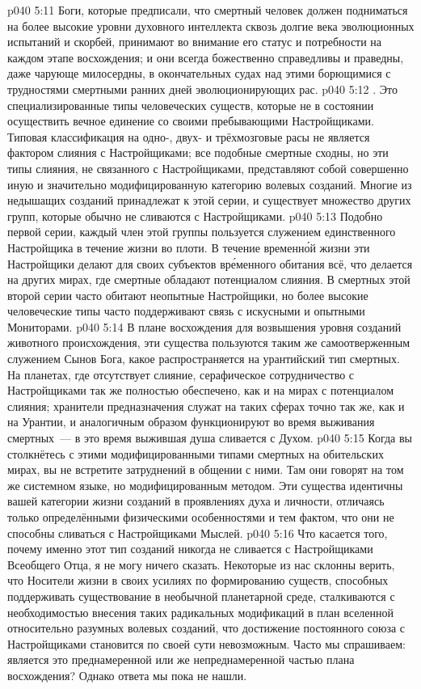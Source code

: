 \vs p040 5:11 \pc Боги, которые предписали, что смертный человек должен подниматься на более высокие уровни духовного интеллекта сквозь долгие века эволюционных испытаний и скорбей, принимают во внимание его статус и потребности на каждом этапе восхождения; и они всегда божественно справедливы и праведны, даже чарующе милосердны, в окончательных судах над этими борющимися с трудностями смертными ранних дней эволюционирующих рас.
\vs p040 5:12 \pc {}. Это специализированные типы человеческих существ, которые не в состоянии осуществить вечное единение со своими пребывающими Настройщиками. Типовая классификация на одно\hyp{}, двух\hyp{} и трёхмозговые расы не является фактором слияния с Настройщиками; все подобные смертные сходны, но эти типы слияния, не связанного с Настройщиками, представляют собой совершенно иную и значительно модифицированную категорию волевых созданий. Многие из недышащих созданий принадлежат к этой серии, и существует множество других групп, которые обычно не сливаются с Настройщиками.
\vs p040 5:13 Подобно первой серии, каждый член этой группы пользуется служением единственного Настройщика в течение жизни во плоти. В течение временн\'ой жизни эти Настройщики делают для своих субъектов вр\'еменного обитания всё, что делается на других мирах, где смертные обладают потенциалом слияния. В смертных этой второй серии часто обитают неопытные Настройщики, но более высокие человеческие типы часто поддерживают связь с искусными и опытными Мониторами.
\vs p040 5:14 В плане восхождения для возвышения уровня созданий животного происхождения, эти существа пользуются таким же самоотверженным служением Сынов Бога, какое распространяется на урантийский тип смертных. На планетах, где отсутствует слияние, серафическое сотрудничество с Настройщиками так же полностью обеспечено, как и на мирах с потенциалом слияния; хранители предназначения служат на таких сферах точно так же, как и на Урантии, и аналогичным образом функционируют во время выживания смертных~--- в это время выжившая душа сливается с Духом.
\vs p040 5:15 Когда вы столкнётесь с этими модифицированными типами смертных на обительских мирах, вы не встретите затруднений в общении с ними. Там они говорят на том же системном языке, но модифицированным методом. Эти существа идентичны вашей категории жизни созданий в проявлениях духа и личности, отличаясь только определёнными физическими особенностями и тем фактом, что они не способны сливаться с Настройщиками Мыслей.
\vs p040 5:16 Что касается того, почему именно этот тип созданий никогда не сливается с Настройщиками Всеобщего Отца, я не могу ничего сказать. Некоторые из нас склонны верить, что Носители жизни в своих усилиях по формированию существ, способных поддерживать существование в необычной планетарной среде, сталкиваются с необходимостью внесения таких радикальных модификаций в план вселенной относительно разумных волевых созданий, что достижение постоянного союза с Настройщиками становится по своей сути невозможным. Часто мы спрашиваем: является это преднамеренной или же непреднамеренной частью плана восхождения? Однако ответа мы пока не нашли.
